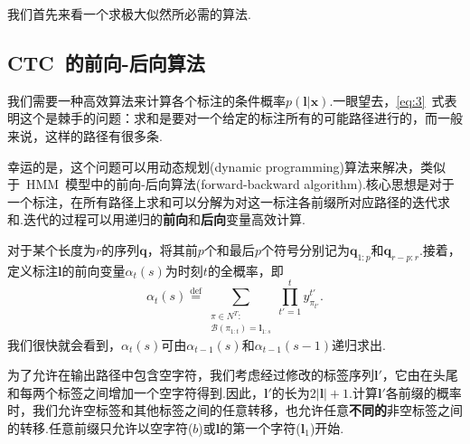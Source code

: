 \documentclass{ctexart}
\def\cB{\mathcal{B}}
\def\vl{\mathbf{l}}
\def\vx{\mathbf{x}}
\def\vq{\mathbf{q}}
\def\defeq{\overset{\mathrm{def}}{=}}
\begin{document}
我们首先来看一个求极大似然所必需的算法.
\subsection{CTC~的前向-后向算法}
\label{sec:forward-backward}
我们需要一种高效算法来计算各个标注的条件概率$p(\vl|\vx)$.一眼望去，\eqref{eq:3}~式表明这个是棘手的问题：求和是要对一个给定的标注所有的可能路径进行的，而一般来说，这样的路径有很多条.

幸运的是，这个问题可以用动态规划(dynamic programming)算法来解决，类似于~HMM~模型中的前向-后向算法(forward-backward algorithm).核心思想是对于一个标注，在所有路径上求和可以分解为对这一标注各前缀所对应路径的迭代求和.迭代的过程可以用递归的\textbf{前向}和\textbf{后向}变量高效计算.

对于某个长度为$r$的序列$\vq$，将其前$p$个和最后$p$个符号分别记为$\vq_{1:p}$和$\vq_{r-p:r}$.接着，定义标注$\vl$的前向变量$\alpha_t(s)$为时刻$t$的全概率，即
\begin{equation}
	\label{eq:5}
	\alpha_t(s)
	\defeq
	\sum_{
		\substack{
			\pi\in N^T:\\
			\cB(\pi_{1:t}) = \vl_{1:s}
		}
	}
	\prod_{t'=1}^t y_{\pi_{t'}}^{t'}.
\end{equation}
我们很快就会看到，$\alpha_t(s)$可由$\alpha_{t-1}(s)$和$\alpha_{t-1}(s-1)$递归求出.

为了允许在输出路径中包含空字符，我们考虑经过修改的标签序列$\vl'$，它由在头尾和每两个标签之间增加一个空字符得到.因此，$\vl'$的长为$2|\vl|+1$.计算$\vl'$各前缀的概率时，我们允许空标签和其他标签之间的任意转移，也允许任意\textbf{不同的}非空标签之间的转移.任意前缀只允许以空字符($b$)或$\vl$的第一个字符($\vl_1$)开始.
\end{document}
